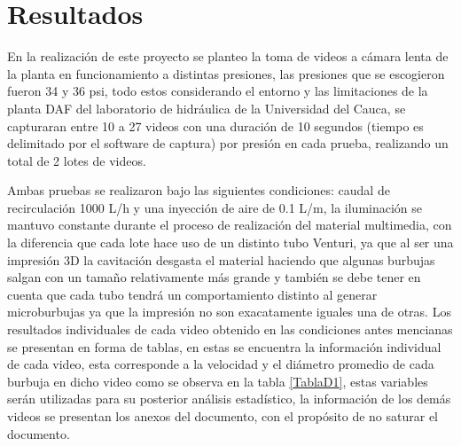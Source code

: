 \documentclass[12pt,twocolumn,a4paper]{article}
\begin{document}
\section{Resultados}

En la realización de este proyecto se planteo la toma de videos a cámara lenta de la planta en funcionamiento a distintas presiones, las presiones que se escogieron fueron 34 y 36 psi, todo estos considerando el entorno y las limitaciones de la planta DAF del laboratorio de hidráulica de la Universidad del Cauca, se capturaran entre 10 a 27 videos con una duración de 10 segundos (tiempo es delimitado por el software de captura) por presión en cada prueba, realizando un total de 2 lotes de videos.

Ambas pruebas se realizaron bajo las siguientes condiciones: caudal de recirculación 1000 L/h y una inyección de aire de 0.1 L/m, la iluminación se mantuvo constante durante el proceso de realización del material multimedia, con la diferencia que cada lote hace uso de un distinto tubo Venturi, ya que al ser una impresión 3D la cavitación desgasta el material haciendo que algunas burbujas salgan con un tamaño relativamente más grande y también se debe tener en cuenta que cada tubo tendrá un comportamiento distinto al generar microburbujas ya que la impresión no son exacatamente iguales una de otras. Los resultados individuales de cada video obtenido en las condiciones antes mencianas se presentan en forma de tablas, en estas se encuentra la información individual de cada video, esta corresponde a la velocidad y el diámetro promedio de cada burbuja en dicho video como se observa en la tabla \ref{TablaD1}, estas variables serán utilizadas para su posterior análisis estadístico, la información de los demás videos se presentan los anexos del documento, con el propósito de no saturar el documento.  
	
\end{document}
